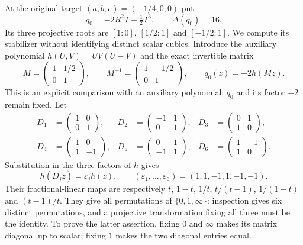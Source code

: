 At the original target $(a,b,c)=(-1/4,0,0)$ put
\[
 q_0=-2R^2T+\tfrac12T^3,
 \qquad\Delta(q_0)=16.
\]
Its three projective roots are $[1:0]$, $[1/2:1]$ and $[-1/2:1]$.
We compute its stabilizer without identifying distinct scalar cubics.
Introduce the auxiliary polynomial $h(U,V)=UV(U-V)$ and the exact
invertible matrix
\[
 M=\begin{pmatrix}1&1/2\\0&1\end{pmatrix},\qquad
 M^{-1}=\begin{pmatrix}1&-1/2\\0&1\end{pmatrix},\qquad
 q_0(z)=-2h(Mz).
\]
This is an explicit comparison with an auxiliary polynomial; $q_0$
and its factor $-2$ remain fixed. Let
\begin{align*}
 D_1&=\begin{pmatrix}1&0\\0&1\end{pmatrix},&
 D_2&=\begin{pmatrix}-1&1\\0&1\end{pmatrix},&
 D_3&=\begin{pmatrix}0&1\\1&0\end{pmatrix},\\
 D_4&=\begin{pmatrix}1&0\\1&-1\end{pmatrix},&
 D_5&=\begin{pmatrix}0&1\\-1&1\end{pmatrix},&
 D_6&=\begin{pmatrix}1&-1\\1&0\end{pmatrix}.
\end{align*}
Substitution in the three factors of $h$ gives
\[
 h(D_jz)=\varepsilon_jh(z),\qquad
 (\varepsilon_1,\ldots,\varepsilon_6)=(1,1,-1,1,-1,-1).
\]
Their fractional-linear maps are respectively
$t$, $1-t$, $1/t$, $t/(t-1)$, $1/(1-t)$ and $(t-1)/t$.
They give all permutations of $\{0,1,\infty\}$: inspection gives
six distinct permutations, and a projective transformation fixing all
three must be the identity. To prove the latter assertion, fixing
$0$ and $\infty$ makes its matrix diagonal up to scalar; fixing $1$
makes the two diagonal entries equal.

